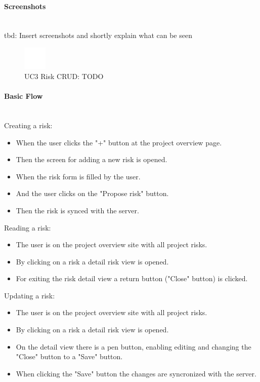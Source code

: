\paragraph*{Screenshots}\mbox{}\\
tbd: Insert screenshots and shortly explain what can be seen
\begin{figure}[h] 
	\centering
	\includegraphics[width=0.1\textwidth]{Content/Domain/placeholder.png}
	\caption{\ac{UC}3 Risk CRUD: TODO}
	\label{fig:label3}
\end{figure}

\newpage
\paragraph*{Basic Flow} \mbox{}\\
\noindent
Creating a risk:
\begin{itemize}
	\vspace{-3mm}
	\setlength\itemsep{-1.5em}
	\item  When the user clicks the "+" button at the project overview page.
	\item Then the screen for adding a new risk is opened.
	\item When the risk form is filled by the user.
	\item And the user clicks on the "Propose risk" button.
	\item Then the risk is synced with the server.
\end{itemize}

\noindent
Reading a risk:
\begin{itemize}
	\vspace{-3mm}
	\setlength\itemsep{-1em}
	\item The user is on the project overview site with all project risks.
	\item By clicking on a risk a detail risk view is opened.
	\item For exiting the risk detail view a return button ("Close" button) is clicked.
\end{itemize}

\noindent
Updating a risk: 
\begin{itemize}
	\vspace{-3mm}
	\setlength\itemsep{-1em}
	\item The user is on the project overview site with all project risks.
	\item By clicking on a risk a detail risk view is opened.
	\item On the detail view there is a pen button, enabling editing and changing the "Close" button to a "Save" button.
	\item When clicking the "Save" button the changes are syncronized with the server.
\end{itemize} 


